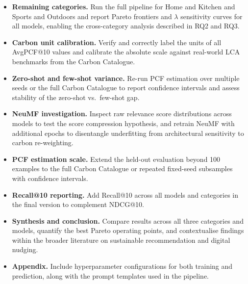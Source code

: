 \documentclass[11pt]{article}
\begin{document}
\begin{itemize}
  \item \textbf{Remaining categories.} Run the full pipeline for Home
    and Kitchen and Sports and Outdoors and report Pareto frontiers and
    $\lambda$ sensitivity curves for all models, enabling the cross-category
    analysis described in RQ2 and RQ3.
  \item \textbf{Carbon unit calibration.} Verify and correctly label
    the units of all AvgPCF@10 values and calibrate the absolute scale
    against real-world LCA benchmarks from the Carbon
    Catalogue.
  \item \textbf{Zero-shot and few-shot variance.} Re-run PCF estimation
    over multiple seeds or the full Carbon Catalogue to report confidence
    intervals and assess stability of the zero-shot vs.\ few-shot gap.
  \item \textbf{NeuMF investigation.} Inspect raw relevance score
    distributions across models to test the score compression hypothesis,
    and retrain NeuMF with additional epochs to disentangle underfitting
    from architectural sensitivity to carbon re-weighting.
  \item \textbf{PCF estimation scale.} Extend the held-out evaluation
    beyond 100 examples to the full Carbon Catalogue or repeated
    fixed-seed subsamples with confidence intervals.
  \item \textbf{Recall@10 reporting.} Add Recall@10 across all models
    and categories in the final version to complement NDCG@10.
  \item \textbf{Synthesis and conclusion.} Compare results across all
    three categories and models, quantify the best Pareto operating
    points, and contextualise findings within the broader literature on
    sustainable recommendation and digital
    nudging.
  \item \textbf{Appendix.} Include hyperparameter configurations for both training and prediction, along with the prompt templates used in the pipeline.
\end{itemize}



\end{document}
